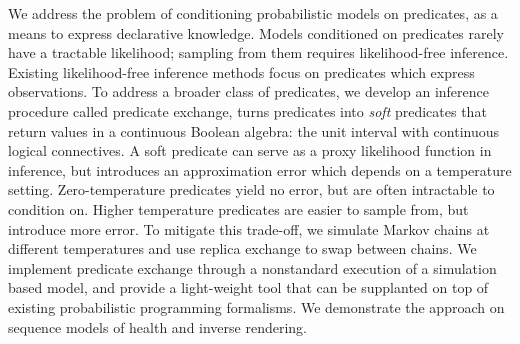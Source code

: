 We address the problem of conditioning probabilistic models on predicates, as a means to express declarative knowledge.
Models conditioned on predicates rarely have a tractable likelihood; sampling from them requires likelihood-free inference.
Existing likelihood-free inference methods
focus on predicates which express observations.
To address a broader class of predicates, we develop an inference procedure called predicate exchange, turns predicates into \emph{soft} predicates that return values in a continuous Boolean algebra: the unit interval with continuous logical connectives.
A soft predicate can serve as a proxy likelihood function in inference,
but introduces an approximation error which depends on a temperature setting.
Zero-temperature predicates yield no error, but are often intractable to condition on.
Higher temperature predicates are easier to sample from, but introduce more error. 
To mitigate this trade-off, we simulate Markov chains at different temperatures and use 
replica exchange to swap between chains.
We implement predicate exchange through a nonstandard execution of a simulation based model, and provide a light-weight tool that can be supplanted on top of existing probabilistic programming formalisms. 
We demonstrate the approach on sequence models of health and inverse rendering.



% 